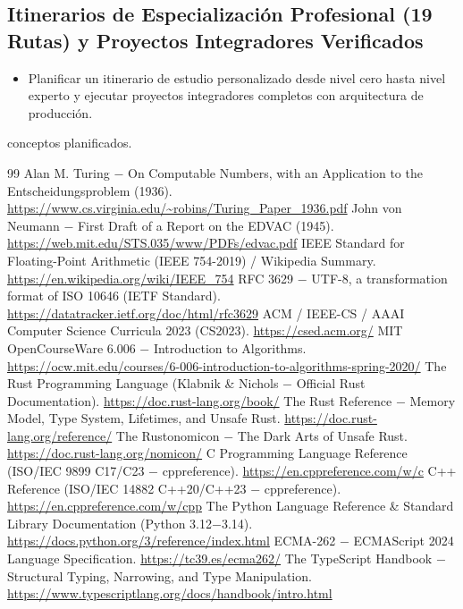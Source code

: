 \documentclass{book}
\begin{document}
\subsection*{\checkmark Itinerarios de Especialización Profesional (19 Rutas) y Proyectos Integradores Verificados}
\begin{itemize}
\item Planificar un itinerario de estudio personalizado desde nivel cero hasta nivel experto y ejecutar proyectos integradores completos con arquitectura de producción.
\end{itemize}
 conceptos planificados.
\backmatter
\begin{thebibliography}{99}
 Alan M. Turing \(-\) On Computable Numbers, with an Application to the Entscheidungsproblem (1936). \url{https://www.cs.virginia.edu/~robins/Turing_Paper_1936.pdf}
 John von Neumann \(-\) First Draft of a Report on the EDVAC (1945). \url{https://web.mit.edu/STS.035/www/PDFs/edvac.pdf}
 IEEE Standard for Floating-Point Arithmetic (IEEE 754-2019) / Wikipedia Summary. \url{https://en.wikipedia.org/wiki/IEEE_754}
 RFC 3629 \(-\) UTF-8, a transformation format of ISO 10646 (IETF Standard). \url{https://datatracker.ietf.org/doc/html/rfc3629}
 ACM / IEEE-CS / AAAI Computer Science Curricula 2023 (CS2023). \url{https://csed.acm.org/}
 MIT OpenCourseWare 6.006 \(-\) Introduction to Algorithms. \url{https://ocw.mit.edu/courses/6-006-introduction-to-algorithms-spring-2020/}
 The Rust Programming Language (Klabnik \& Nichols \(-\) Official Rust Documentation). \url{https://doc.rust-lang.org/book/}
 The Rust Reference \(-\) Memory Model, Type System, Lifetimes, and Unsafe Rust. \url{https://doc.rust-lang.org/reference/}
 The Rustonomicon \(-\) The Dark Arts of Unsafe Rust. \url{https://doc.rust-lang.org/nomicon/}
 C Programming Language Reference (ISO/IEC 9899 C17/C23 \(-\) cppreference). \url{https://en.cppreference.com/w/c}
 C++ Reference (ISO/IEC 14882 C++20/C++23 \(-\) cppreference). \url{https://en.cppreference.com/w/cpp}
 The Python Language Reference \& Standard Library Documentation (Python 3.12\(-\)3.14). \url{https://docs.python.org/3/reference/index.html}
 ECMA-262 \(-\) ECMAScript 2024 Language Specification. \url{https://tc39.es/ecma262/}
 The TypeScript Handbook \(-\) Structural Typing, Narrowing, and Type Manipulation. \url{https://www.typescriptlang.org/docs/handbook/intro.html}

\end{thebibliography}
\end{document}
